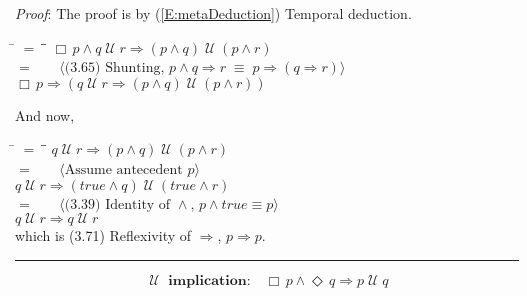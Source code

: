 \documentclass[12pt, fleqn, leqno]{article}
\newcommand{\lgap}{2pt}                             %
\newcommand{\mymathindent}{24pt}                    %
\newcommand{\equivs}{\ensuremath{\;\equiv\;}}       %
\newcommand{\impl}{\ensuremath{\Rightarrow}}        %
\newcommand{\Until}{\;\mathcal{U}\;}
\newcommand{\Event}{\Diamond\,}
\newcommand{\Always}{\Box\,}
\newcommand{\myqed}{\rule[-.23ex]{1.2ex}{2.0ex}}
\newcommand{\myqedtab}{\hspace{384pt}}              %
\newcommand{\Gll} {\langle}                         %
\newcommand{\Ggg} {\rangle}                         %
\newcommand{\Hint}[1]     {\ \ \ $\Gll              \mbox{#1} \Ggg$ }   %
\begin{document}
\emph{Proof}: The proof is by (\ref{E:metaDeduction}) Temporal deduction.
\begin{tabbing}
\hspace{\mymathindent} \= $= \;$ \= \myqedtab \= \kill
  \> \>   $\Always p \land q \Until r \impl (p \land q) \Until (p \land r)$\\[\lgap]
  \> $=$  \>  \Hint{(3.65) Shunting, $p\land q\impl r\equivs p\impl (q\impl r)$}\\[\lgap]
  \> \>   $\Always p \impl (q \Until r \impl (p \land q) \Until (p \land r))$
\end{tabbing}
And now,
\begin{tabbing}
\hspace{\mymathindent} \= $= \;$ \= \myqedtab \= \kill
  \> \>   $q \Until r \impl (p \land q) \Until (p \land r)$\\[\lgap]
  \> $=$  \>  \Hint{Assume antecedent $p$}\\[\lgap]
  \> \>   $q \Until r \impl (true \land q) \Until (true \land r)$\\[\lgap]
 \> $=$ \> \Hint{(3.39) Identity of $\land$, $p\land true \equiv p$} \\[\lgap]
  \> \>   $q \Until r \impl q \Until r$\\[\lgap]
    \> which is (3.71) Reflexivity of $\impl$, $p\impl p$. \quad \myqed
\end{tabbing}
\begin{equation}\label{E:axiomUntilImpl}
\textbf{$\Until$ implication:}\quad \Always p \land \Event q \impl p \Until q
\end{equation}
\end{document}
